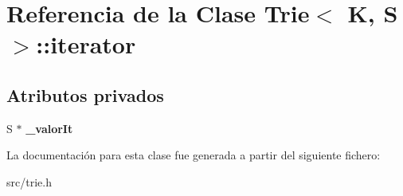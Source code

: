 \hypertarget{classTrie_1_1iterator}{\section{Referencia de la Clase Trie$<$ K, S $>$\-:\-:iterator}
\label{classTrie_1_1iterator}
}
\subsection*{Atributos privados}
\begin{DoxyCompactItemize}
\item 
\hypertarget{classTrie_1_1iterator_ad16f81fb1d44366367f36a373dd6ea76}{S $\ast$ {\bfseries \-\_\-valor\-It}}\label{classTrie_1_1iterator_ad16f81fb1d44366367f36a373dd6ea76}

\end{DoxyCompactItemize}


La documentación para esta clase fue generada a partir del siguiente fichero\-:\begin{DoxyCompactItemize}
\item 
src/trie.\-h\end{DoxyCompactItemize}
